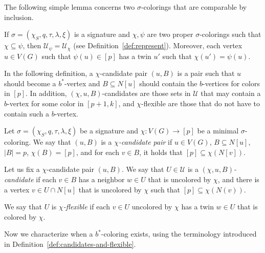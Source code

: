 \documentclass[runningheads, envcountsame]{llncs}
\newcommand{\seq}{\subseteq}
\newcommand{\ca}{\mathcal}
\begin{document}
The following simple lemma concerns two $\sigma$-colorings that are comparable by inclusion.

\begin{lemma}\label{lem:twins}
If $\sigma = (\chi_S, q, \tau, \lambda, \xi)$ is a signature and $\chi, \psi$ are two proper $\sigma$-colorings such that $\chi\seq\psi$, then $\ca U_\psi = \ca U_\chi$ (see Definition~\ref{def:represent}).
Moreover, each vertex $u\in V(G)$ such that $\psi(u) \in [p]$ has a twin $u'$ such that $\chi(u') = \psi(u)$.
\end{lemma}

In the following definition, a $\chi$-candidate pair $(u, B)$ is a pair such that $u$ should become a $b^*$-vertex and $B \seq N[u]$ should contain the $b$-vertices for colors in $[p]$.
In addition, $(\chi, u, B)$-candidates are those sets in $\ca U$ that may contain a $b$-vertex for some color in $[p+1, k]$, and $\chi$-flexible are those that do not have to contain such a $b$-vertex.

\begin{definition}\label{def:candidates-and-flexible}
Let $\sigma = (\chi_S, q, \tau, \lambda, \xi)$ be a signature and $\chi\colon V(G) \rightarrow [p]$ be a minimal $\sigma$-coloring.
We say that $(u, B)$ is a \emph{$\chi$-candidate pair} if $u \in V(G)$, $B \seq N[u]$, $|B| = p$, $\chi(B) = [p]$, and for each $v \in B$, it holds that $[p] \seq \chi(N[v])$.

Let us fix a $\chi$-candidate pair $(u, B)$.
We say that $U \in \ca U$ is a \emph{$(\chi, u, B)$-candidate} if each $v \in B$ has a neighbor $w \in U$ that is uncolored by $\chi$, and
there is a vertex $v\in U \cap N[u]$ that is uncolored by $\chi$ such that $[p] \seq \chi(N(v))$.

We say that $U$ is \emph{$\chi$-flexible} if each $v\in U$ uncolored by $\chi$ has a twin $w \in U$ that is colored by $\chi$.
\end{definition}

Now we characterize when a $b^*$-coloring exists, using the terminology introduced in Definition~\ref{def:candidates-and-flexible}.
\end{document}
